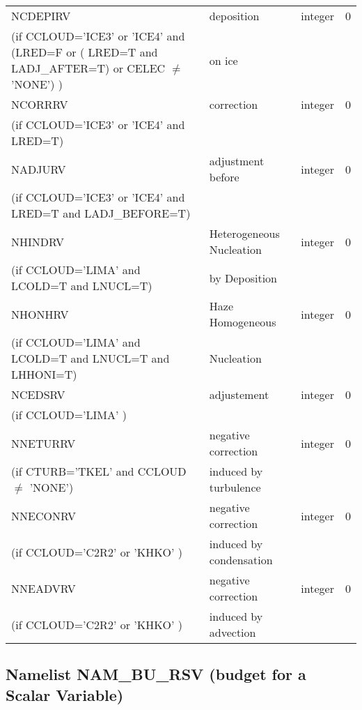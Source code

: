 \begin{longtable} {|p{}|p{}|>{\centering}p{}|p{}<{\centering}|}
NCDEPIRV   & deposition & integer  &  0 \index{NCDEPIRV!\innam{NAM\_BU\_RRV}}\\ \nopagebreak
(if CCLOUD='ICE3' or 'ICE4' and (LRED=F or ( LRED=T and LADJ\_AFTER=T) or CELEC $\neq$ 'NONE')  ) &on ice &   &  \\\hline
NCORRRV  & correction          & integer  &  0 \index{NCORRRV!\innam{NAM\_BU\_RRV}}\\ \nopagebreak
(if CCLOUD='ICE3' or 'ICE4' and LRED=T) & &   &  \\\hline
NADJURV  & adjustment before          & integer  &  0 \index{NADJURV!\innam{NAM\_BU\_RRV}}\\ \nopagebreak
(if CCLOUD='ICE3' or 'ICE4' and LRED=T and LADJ\_BEFORE=T) & &   &  \\\hline
NHINDRV   & Heterogeneous Nucleation& integer  &  0 \index{NHINDRV!\innam{NAM\_BU\_RRV}}\\ \nopagebreak
(if CCLOUD='LIMA' and LCOLD=T and LNUCL=T) & by Deposition  &   &  \\\hline
NHONHRV   &Haze Homogeneous   & integer  &  0 \index{NHONHRV!\innam{NAM\_BU\_RRV}}\\ \nopagebreak
(if CCLOUD='LIMA' and LCOLD=T and LNUCL=T and LHHONI=T) & Nucleation  &   &  \\\hline
NCEDSRV   & adjustement & integer  &  0 \index{NCEDSRV!\innam{NAM\_BU\_RRV}}\\ \nopagebreak
(if CCLOUD='LIMA'  ) & &   &  \\\hline
NNETURRV   & negative correction  & integer  &  0 \index{NNETURRV!\innam{NAM\_BU\_RRV}}\\ \nopagebreak
(if CTURB='TKEL' and CCLOUD $\neq$ 'NONE') & induced by turbulence&   &  \\\hline
 NNECONRV  & negative correction & integer  &  0 \index{NNECONRV!\innam{NAM\_BU\_RRV}}\\ \nopagebreak
(if CCLOUD='C2R2' or 'KHKO'  ) & induced by condensation&   &  \\\hline
NNEADVRV&negative correction   & integer  &  0 \index{NNEADVRV!\innam{NAM\_BU\_RRV}}\\ \nopagebreak
(if CCLOUD='C2R2' or 'KHKO'  ) & induced by advection&   &  \\\hline
\end{longtable}

\subsection{Namelist NAM\_BU\_RSV (budget for a Scalar Variable)}

